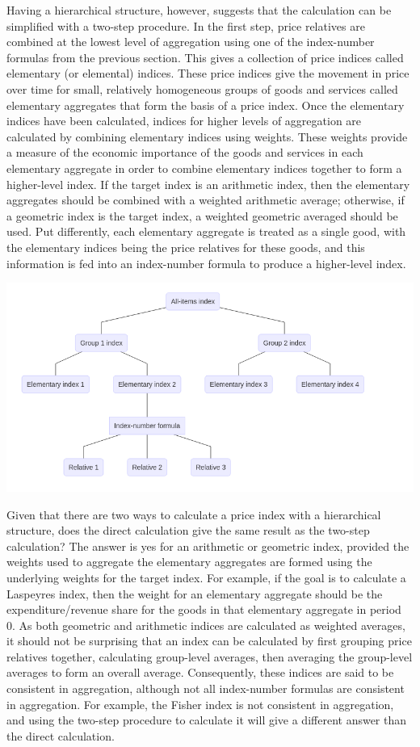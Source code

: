 \documentclass[
]{article}
\begin{document}
Having a hierarchical structure, however, suggests that the calculation can be simplified with a two-step procedure. In the first step, price relatives are combined at the lowest level of aggregation using one of the index-number formulas from the previous section. This gives a collection of price indices called elementary (or elemental) indices. These price indices give the movement in price over time for small, relatively homogeneous groups of goods and services called elementary aggregates that form the basis of a price index. Once the elementary indices have been calculated, indices for higher levels of aggregation are calculated by combining elementary indices using weights. These weights provide a measure of the economic importance of the goods and services in each elementary aggregate in order to combine elementary indices together to form a higher-level index. If the target index is an arithmetic index, then the elementary aggregates should be combined with a weighted arithmetic average; otherwise, if a geometric index is the target index, a weighted geometric averaged should be used. Put differently, each elementary aggregate is treated as a single good, with the elementary indices being the price relatives for these goods, and this information is fed into an index-number formula to produce a higher-level index.

\includegraphics{img/plot2.png}

Given that there are two ways to calculate a price index with a hierarchical structure, does the direct calculation give the same result as the two-step calculation? The answer is yes for an arithmetic or geometric index, provided the weights used to aggregate the elementary aggregates are formed using the underlying weights for the target index. For example, if the goal is to calculate a Laspeyres index, then the weight for an elementary aggregate should be the expenditure/revenue share for the goods in that elementary aggregate in period 0. As both geometric and arithmetic indices are calculated as weighted averages, it should not be surprising that an index can be calculated by first grouping price relatives together, calculating group-level averages, then averaging the group-level averages to form an overall average. Consequently, these indices are said to be consistent in aggregation, although not all index-number formulas are consistent in aggregation. For example, the Fisher index is not consistent in aggregation, and using the two-step procedure to calculate it will give a different answer than the direct calculation.
\end{document}
